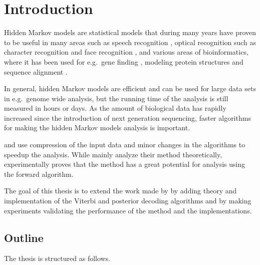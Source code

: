 \chapter{Introduction}

Hidden Markov models are statistical models that during many years have proven
to be useful in many areas such as speech recognition
\citep{rabiner1989tutorial}, optical recognition such as character recognition
\citep{agazzi1993hidden} and face recognition \citep{nefian1998hidden}, and
various areas of bioinformatics, where it has been used for e.g.\ gene finding
\citep{burge1997prediction}, modeling protein structures and sequence alignment
\citep{eddy1998profile}.

In general, hidden Markov models are efficient and can be used for large data
sets in e.g.\ genome wide analysis, but the running time of the analysis is
still measured in hours or days. As the amount of biological data has
rapidly increased since the introduction of next generation sequencing, faster
algorithms for making the hidden Markov models analysis is important.

\citet{lifshits2009speeding} and \citet{sand2013ziphmmlib} use compression of
the input data and minor changes in the algorithms to speedup the
analysis. While \citet{lifshits2009speeding} mainly analyze their method
theoretically, \citet{sand2013ziphmmlib} experimentally proves that the method
has a great potential for analysis using the forward algorithm.

The goal of this thesis is to extend the work made by \citet{sand2013ziphmmlib}
by adding theory and implementation of the Viterbi and posterior decoding
algorithms and by making experiments validating the performance of the method
and the implementations.

\section{Outline}

The thesis is structured as follows.

